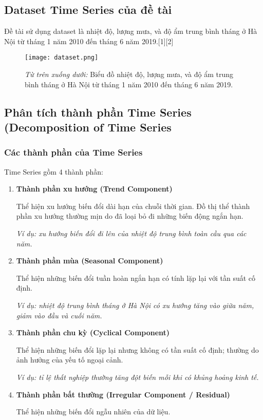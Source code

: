 \documentclass[12pt]{article}
\begin{document}
    \subsection{Dataset Time Series của đề tài}
        
        Đề tài sử dụng dataset là nhiệt độ, lượng mưa, và độ ẩm trung bình tháng ở Hà Nội từ tháng 1 năm 2010 đến tháng 6 năm 2019.[1][2]
        
        \begin{figure}[H]
            \centering
            \texttt{[image: dataset.png]}
            \caption{\textit{Từ trên xuống dưới:} Biểu đồ nhiệt độ, lượng mưa, và độ ẩm trung bình tháng ở Hà Nội từ tháng 1 năm 2010 đến tháng 6 năm 2019.}
        \end{figure}
        
    \subsection{Phân tích thành phần Time Series (Decomposition of Time Series}

        \subsubsection{Các thành phần của Time Series}
        Time Series gồm 4 thành phần:
        \begin{enumerate}
            \item \textbf{Thành phần xu hướng (Trend Component)}
            
            Thể hiện xu hướng biến đổi dài hạn của chuỗi thời gian. Đồ thị thể thành phần xu hướng thường mịn do đã loại bỏ đi những biến động ngắn hạn.
            
            \textit{Ví dụ: xu hướng biến đổi đi lên của nhiệt độ trung bình toàn cầu qua các năm.}
            
            \item \textbf{Thành phần mùa (Seasonal Component)}
            
            Thể hiện những biến đổi tuần hoàn ngắn hạn có tính lặp lại với tần suất cố định.
            
            \textit{Ví dụ: nhiệt độ trung bình tháng ở Hà Nội có xu hướng tăng vào giữa năm, giảm vào đầu và cuối năm.}
            
            \item \textbf{Thành phần chu kỳ (Cyclical Component)}
            
            Thể hiện những biến đổi lặp lại nhưng không có tần suất cố định; thường do ảnh hưởng của yếu tố ngoại cảnh.
            
            \textit{Ví dụ: tỉ lệ thất nghiệp thường tăng đột biến mỗi khi có khủng hoảng kinh tế.}
            
            \item \textbf{Thành phần bất thường (Irregular Component / Residual)}
            
            Thể hiện những biến đổi ngẫu nhiên của dữ liệu.
        \end{enumerate}
        
\end{document}
